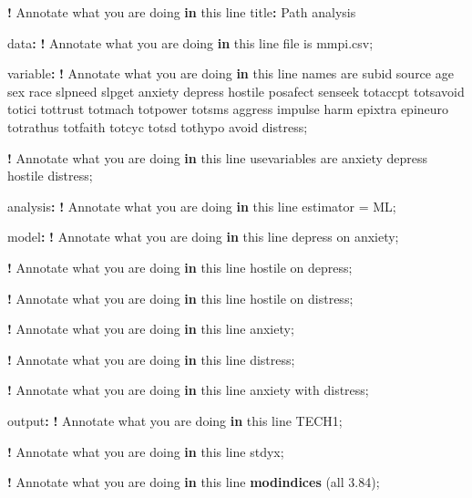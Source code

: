 \documentclass[
]{book}
\newenvironment{Shaded}{\begin{snugshade}}{\end{snugshade}}
\newcommand{\ControlFlowTok}[1]{\textcolor[rgb]{0.13,0.29,0.53}{\textbf{#1}}}
\newcommand{\FloatTok}[1]{\textcolor[rgb]{0.00,0.00,0.81}{#1}}
\newcommand{\FunctionTok}[1]{\textcolor[rgb]{0.13,0.29,0.53}{\textbf{#1}}}
\newcommand{\NormalTok}[1]{#1}
\newcommand{\OtherTok}[1]{\textcolor[rgb]{0.56,0.35,0.01}{#1}}
\newcommand{\SpecialCharTok}[1]{\textcolor[rgb]{0.81,0.36,0.00}{\textbf{#1}}}
\begin{document}
\begin{Shaded}
\begin{Highlighting}[]
\SpecialCharTok{!}\NormalTok{ Annotate what you are doing }\ControlFlowTok{in}\NormalTok{ this line}
\NormalTok{title}\SpecialCharTok{:}\NormalTok{ Path analysis}

\NormalTok{data}\SpecialCharTok{:}
\SpecialCharTok{!}\NormalTok{ Annotate what you are doing }\ControlFlowTok{in}\NormalTok{ this line}
\NormalTok{file is mmpi.csv;}

\NormalTok{variable}\SpecialCharTok{:}
\SpecialCharTok{!}\NormalTok{ Annotate what you are doing }\ControlFlowTok{in}\NormalTok{ this line}
\NormalTok{names are subid source age sex race slpneed slpget anxiety depress}
\NormalTok{hostile posafect senseek totaccpt totsavoid totici tottrust totmach}
\NormalTok{totpower totsms aggress impulse harm epixtra epineuro totrathus}
\NormalTok{totfaith totcyc totsd tothypo avoid distress;}

\SpecialCharTok{!}\NormalTok{ Annotate what you are doing }\ControlFlowTok{in}\NormalTok{ this line}
\NormalTok{usevariables are anxiety depress hostile distress;}

\NormalTok{analysis}\SpecialCharTok{:}
\SpecialCharTok{!}\NormalTok{ Annotate what you are doing }\ControlFlowTok{in}\NormalTok{ this line}
\NormalTok{estimator }\OtherTok{=}\NormalTok{ ML;}

\NormalTok{model}\SpecialCharTok{:}
\SpecialCharTok{!}\NormalTok{ Annotate what you are doing }\ControlFlowTok{in}\NormalTok{ this line}
\NormalTok{depress on anxiety;}

\SpecialCharTok{!}\NormalTok{ Annotate what you are doing }\ControlFlowTok{in}\NormalTok{ this line}
\NormalTok{hostile on depress;}

\SpecialCharTok{!}\NormalTok{ Annotate what you are doing }\ControlFlowTok{in}\NormalTok{ this line}
\NormalTok{hostile on distress;}

\SpecialCharTok{!}\NormalTok{ Annotate what you are doing }\ControlFlowTok{in}\NormalTok{ this line}
\NormalTok{anxiety;}

\SpecialCharTok{!}\NormalTok{ Annotate what you are doing }\ControlFlowTok{in}\NormalTok{ this line}
\NormalTok{distress;}

\SpecialCharTok{!}\NormalTok{ Annotate what you are doing }\ControlFlowTok{in}\NormalTok{ this line}
\NormalTok{anxiety with distress;}

\NormalTok{output}\SpecialCharTok{:}
\SpecialCharTok{!}\NormalTok{ Annotate what you are doing }\ControlFlowTok{in}\NormalTok{ this line}
\NormalTok{TECH1;}

\SpecialCharTok{!}\NormalTok{ Annotate what you are doing }\ControlFlowTok{in}\NormalTok{ this line}
\NormalTok{stdyx;}

\SpecialCharTok{!}\NormalTok{ Annotate what you are doing }\ControlFlowTok{in}\NormalTok{ this line}
\FunctionTok{modindices}\NormalTok{ (all }\FloatTok{3.84}\NormalTok{);}
\end{Highlighting}
\end{Shaded}
\end{document}
